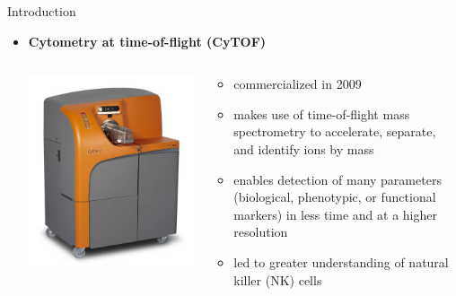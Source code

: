 \documentclass[ignorenonframetext,]{beamer}
\begin{document}
\begin{frame}{Introduction}
\begin{itemize}
\item
  \textbf{Cytometry at time-of-flight (CyTOF)} \setlength\itemsep{1em}
  \begin{minipage}{\textwidth}
  \begin{columns}[T]
  \begin{column}{0.1\textwidth}
  \vspace{5em}
  \includegraphics[scale=0.5]{img/CyTOF_instrument.jpg}
  \end{column}
  \begin{column}{0.6\textwidth}
  \begin{itemize}
  \item
  commercialized in 2009
  \item 
  makes use of time-of-flight mass spectrometry to accelerate, separate, and
  identify ions by mass
  \item
  enables detection of many parameters (biological, phenotypic, or functional
  markers) in less time and at a higher resolution \citep{cheung2011screening}
  \item 
  led to greater understanding of natural killer (NK) cells
  \end{itemize}
  \end{column}
  \end{columns}
  \end{minipage}
\end{itemize}
\end{frame}
\end{document}
